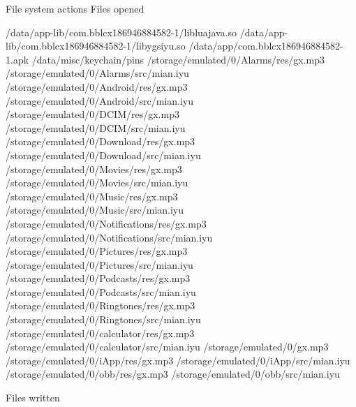 \documentclass[
]{article}
\newenvironment{Shaded}{}{}
\newcommand{\NormalTok}[1]{#1}
\begin{document}
\begin{Shaded}
\begin{Highlighting}[]
\NormalTok{File system actions}
\NormalTok{Files opened}

\NormalTok{    /data/app{-}lib/com.bblcx186946884582{-}1/libluajava.so}
\NormalTok{    /data/app{-}lib/com.bblcx186946884582{-}1/libygsiyu.so}
\NormalTok{    /data/app/com.bblcx186946884582{-}1.apk}
\NormalTok{    /data/misc/keychain/pins}
\NormalTok{    /storage/emulated/0/Alarms/res/gx.mp3}
\NormalTok{    /storage/emulated/0/Alarms/src/mian.iyu}
\NormalTok{    /storage/emulated/0/Android/res/gx.mp3}
\NormalTok{    /storage/emulated/0/Android/src/mian.iyu}
\NormalTok{    /storage/emulated/0/DCIM/res/gx.mp3}
\NormalTok{    /storage/emulated/0/DCIM/src/mian.iyu}
\NormalTok{    /storage/emulated/0/Download/res/gx.mp3}
\NormalTok{    /storage/emulated/0/Download/src/mian.iyu}
\NormalTok{    /storage/emulated/0/Movies/res/gx.mp3}
\NormalTok{    /storage/emulated/0/Movies/src/mian.iyu}
\NormalTok{    /storage/emulated/0/Music/res/gx.mp3}
\NormalTok{    /storage/emulated/0/Music/src/mian.iyu}
\NormalTok{    /storage/emulated/0/Notifications/res/gx.mp3}
\NormalTok{    /storage/emulated/0/Notifications/src/mian.iyu}
\NormalTok{    /storage/emulated/0/Pictures/res/gx.mp3}
\NormalTok{    /storage/emulated/0/Pictures/src/mian.iyu}
\NormalTok{    /storage/emulated/0/Podcasts/res/gx.mp3}
\NormalTok{    /storage/emulated/0/Podcasts/src/mian.iyu}
\NormalTok{    /storage/emulated/0/Ringtones/res/gx.mp3}
\NormalTok{    /storage/emulated/0/Ringtones/src/mian.iyu}
\NormalTok{    /storage/emulated/0/calculator/res/gx.mp3}
\NormalTok{    /storage/emulated/0/calculator/src/mian.iyu}
\NormalTok{    /storage/emulated/0/gx.mp3}
\NormalTok{    /storage/emulated/0/iApp/res/gx.mp3}
\NormalTok{    /storage/emulated/0/iApp/src/mian.iyu}
\NormalTok{    /storage/emulated/0/obb/res/gx.mp3}
\NormalTok{    /storage/emulated/0/obb/src/mian.iyu}

\NormalTok{Files written}


\end{Highlighting}
\end{Shaded}
\end{document}
